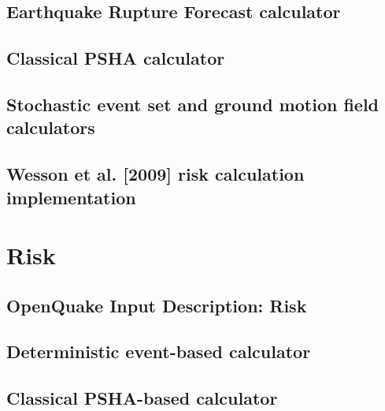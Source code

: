 \documentclass[12pt,a4paper,smallheadings]{scrbook}
\begin{document}
\chapter{Earthquake Rupture Forecast calculator}
	\label{chap:erf}
	
\chapter{Classical PSHA calculator}
	
\chapter{Stochastic event set and ground motion field calculators}
	
\chapter{Wesson et al. [2009] risk calculation implementation}
	
\part{Risk}
\chapter{OpenQuake Input Description: Risk}
	
\chapter{Deterministic event-based calculator}
	
\chapter{Classical PSHA-based calculator}
	
\end{document}

